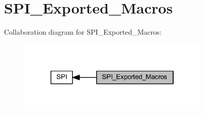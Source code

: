 \hypertarget{group___s_p_i___exported___macros}{}\section{S\+P\+I\+\_\+\+Exported\+\_\+\+Macros}
\label{group___s_p_i___exported___macros}
Collaboration diagram for S\+P\+I\+\_\+\+Exported\+\_\+\+Macros\+:
\nopagebreak
\begin{figure}[H]
\begin{center}
\leavevmode
\includegraphics[width=262pt]{group___s_p_i___exported___macros}
\end{center}
\end{figure}
